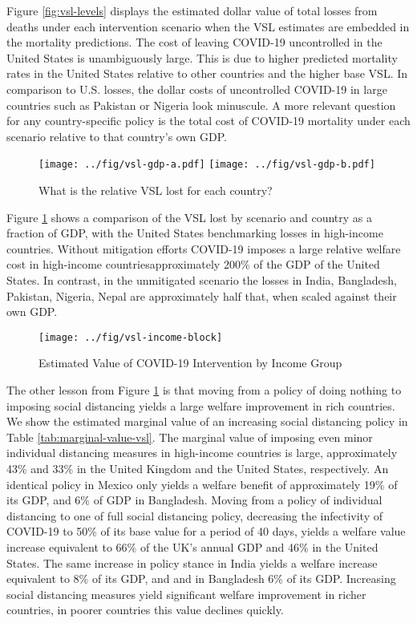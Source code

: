 \documentclass[11pt]{article}
\begin{document}
Figure \ref{fig:vsl-levels} displays the estimated dollar value of total losses from deaths under each intervention scenario when the \textcite{viscusi2017} VSL estimates are embedded in the mortality predictions. The cost of leaving COVID-19 uncontrolled in the United States is unambiguously large. This is due to higher predicted mortality rates in the United States relative to other countries and the higher base VSL. In comparison to U.S. losses, the dollar costs of uncontrolled COVID-19 in large countries such as Pakistan or Nigeria look minuscule. A more relevant question for any country-specific policy is the total cost of COVID-19 mortality under each scenario relative to that country's own GDP. 


\begin{figure}[htbp!]
\centering
\caption{What is the relative VSL lost for each country?}
  \texttt{[image: ../fig/vsl-gdp-a.pdf]}
  \texttt{[image: ../fig/vsl-gdp-b.pdf]}
\label{fig:vsl-gdp}
\end{figure}

Figure \ref{fig:vsl-gdp} shows a comparison of the VSL lost by scenario and country as a fraction of GDP, with the United States benchmarking losses in high-income countries. Without mitigation efforts COVID-19 imposes a large relative welfare cost in high-income countries\textemdash approximately 200\% of the GDP of the United States. In contrast, in the unmitigated scenario the losses in India, Bangladesh, Pakistan, Nigeria, Nepal are approximately half that, when scaled against their own GDP.

\begin{figure}[htbp!]
\centering
\label{fig:vsl-income}
\caption{Estimated Value of COVID-19 Intervention by Income Group}
\texttt{[image: ../fig/vsl-income-block]}
\end{figure}


The other lesson from Figure \ref{fig:vsl-gdp} is that moving from a policy of doing nothing to imposing social distancing yields a large welfare improvement in rich countries. We show the estimated marginal value of an increasing social distancing policy in Table \ref{tab:marginal-value-vsl}. The marginal value of imposing even minor individual distancing measures in high-income countries is large, approximately 43\% and 33\% in the United Kingdom and the United States, respectively. An identical policy in Mexico only yields a welfare benefit of approximately 19\% of its GDP, and 6\% of GDP in Bangladesh. Moving from a policy of individual distancing to one of full social distancing policy, decreasing the infectivity of COVID-19 to 50\% of its base value for a period of 40 days, yields a welfare value increase equivalent to 66\% of the UK's annual GDP and 46\% in the United States. The same increase in policy stance in India yields a welfare increase equivalent to 8\% of its GDP, and and in Bangladesh 6\% of its GDP. Increasing social distancing measures yield significant welfare improvement in richer countries, in poorer countries this value declines quickly. %
\end{document}
